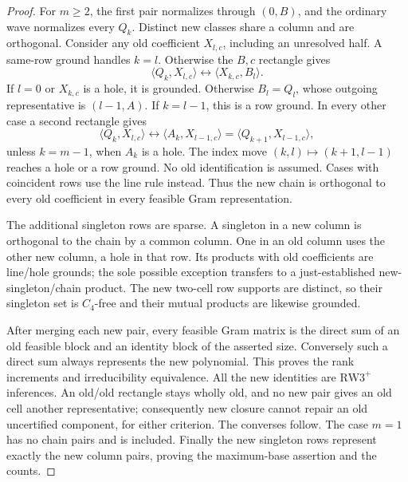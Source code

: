 \documentclass[11pt,a4paper]{article}
\theoremstyle{definition}
\newcommand{\RW}{\mathrm{RW3}^{+}}
\begin{document}
\begin{proof}
For $m\ge2$, the first pair normalizes through $(0,B)$, and the ordinary wave
normalizes every $Q_k$. Distinct new classes share a column and are
orthogonal. Consider any old coefficient $X_{l,c}$, including an
unresolved half. A same-row ground handles $k=l$. Otherwise the
$B,c$ rectangle gives
\[
 \langle Q_k,X_{l,c}\rangle
   \longleftrightarrow \langle X_{k,c},B_l\rangle.
\]
If $l=0$ or $X_{k,c}$ is a hole, it is grounded. Otherwise
$B_l=Q_l$, whose outgoing representative is $(l-1,A)$.
If $k=l-1$, this is a row ground. In every other case a second
rectangle gives
\begin{equation}\label{eq:universaldrift}
 \langle Q_k,X_{l,c}\rangle
   \longleftrightarrow\langle A_k,X_{l-1,c}\rangle
   =\langle Q_{k+1},X_{l-1,c}\rangle,
\end{equation}
unless $k=m-1$, when $A_k$ is a hole. The index move $(k,l)\mapsto
(k+1,l-1)$ reaches a hole or a row ground. No old identification is
assumed. Cases with coincident rows use the line rule instead. Thus the new chain is orthogonal to every old
coefficient in every feasible Gram representation.

The additional singleton rows are sparse. A singleton in a new column
is orthogonal to the chain by a common column. One in an old column
uses the other new column, a hole in that row. Its products with old
coefficients are line/hole grounds; the sole possible exception
transfers to a just-established new-singleton/chain product. The new
two-cell row supports are distinct, so their singleton set is $C_4$-free
and their mutual products are likewise grounded.

After merging each new pair, every feasible Gram matrix is the direct
sum of an old feasible block and an identity block of the asserted
size. Conversely such a direct sum always represents the new
polynomial. This proves the rank increments and irreducibility
equivalence. All the new identities are $\RW$ inferences. An old/old
rectangle stays wholly old, and no new pair gives an old cell another
representative; consequently new closure cannot repair an old
uncertified component, for either criterion. The converses follow.
The case $m=1$ has no chain pairs and is included. Finally the new
singleton rows represent exactly the new column pairs, proving the
maximum-base assertion and the counts.
\end{proof}
\end{document}
